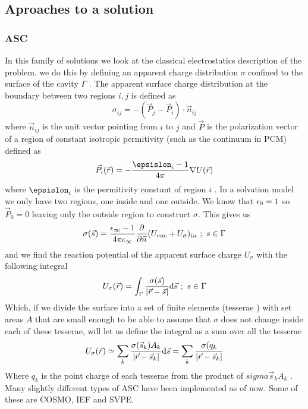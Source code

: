 \documentclass[../master_thesis.tex]{subfiles}
\begin{document}
\subsection{Aproaches to a solution}
\subsubsection{ \ac{ASC}}
In this family of solutions we look at the classical electrostatics description
of the problem. we do this by defining an apparent charge distribution
$\sigma$ confined to the surface of the cavity $\Gamma$ \cite{Tomasi:1994wt, Tomasi:2005ipa}.
The apparent surface charge distribution at the boundary between two regions $i, j$
is defined as
\begin{equation}
  \sigma_{ij} = -(\vec{P}_j - \vec{P}_i)\cdot\vec{n}_{ij}
\end{equation}
where $\vec{n}_{ij}$ is the unit vector pointing from $i$ to $j$ and $\vec{P}$ is
the polarization vector of a region of constant isotropic permitivity (such as
the continuum in \ac{PCM}) defined as
\begin{equation}
  \vec{P}_i (\rvec) = - \frac{\epsislon_i - 1}{4\pi}\nabla U(\rvec)
\end{equation}
where $\epsislon_i$ is the permitivity constant of region $i$ \cite{Tomasi:2005ipa}.
In a solvation model we only have two regions, one inside and one outside. We
know that $\epsilon_{0} = 1$ so $\vec{P}_0 = 0$ leaving only the outside region to
construct $\sigma$. This gives us \cite{Tomasi:2005ipa}
\begin{equation}
  \sigma(\vec{s}) =\frac{\epsilon_{\infty} - 1}{4\pi\epsilon_{\infty}} \frac{\partial}{\partial\vec{n}} (U_{vac} + U_{\sigma})_{in}\ ;\ s \in \Gamma
\end{equation}
and we find the reaction potential of the apparent surface charge $U_{\sigma}$
with the following integral
 \begin{equation}
   U_{\sigma}(\vec{r}) = \int_{\Gamma}\frac{\sigma(\vec{s})}{\abs{\vec{r} - \vec{s}}} \text{d}\vec{s}\ ;\ s \in \Gamma
 \end{equation}
Which, if we divide the surface into a set of finite elements (tesserae
\cite{Tomasi:2005ipa, Sorland}) with set areas $A$ that are small enough to be able
to assume that $\sigma$ does not change inside each of these tesserae, will let us define the integral
as a sum over all the tesserae
\begin{equation}
   U_{\sigma}(\vec{r}) \simeq \sum_k\frac{\sigma(\vec{s}_k) A_k}{\abs{\vec{r} - \vec{s}_k}} \text{d}\vec{s}
   = \sum_k\frac{\sigma(q_k}{\abs{\vec{r} - \vec{s}_k}}
\end{equation}
Where $q_k$ is the point charge of each tesserae from the product of $sigma{\vec{s}_k}A_k$
\cite{Tomasi:2005ipa}.
Many slightly different types of \ac{ASC} have been implemented as of now. Some of these
are \ac{COSMO}, \ac{IEF} and \ac{SVPE}.
\end{document}
